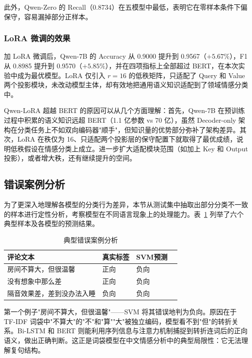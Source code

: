 此外，Qwen-Zero 的 Recall（0.8734）在五模型中最低，表明它在零样本条件下偏保守，容易漏掉部分正样本。

\subsubsection{LoRA 微调的效果}

加 LoRA 微调后，Qwen-7B 的 Accuracy 从 0.9000 提升到 0.9567（$+5.67\%$），F1 从 0.8985 提升到 0.9570（$+5.85\%$），并在四项指标上全部超过 BERT，在本次实验中成为最优模型。LoRA 仅引入 $r=16$ 的低秩矩阵，只适配了 Query 和 Value 两个投影模块，未改动模型主体，却有效地把通用语义知识适配到了领域情感分类中。

Qwen-LoRA 超越 BERT 的原因可以从几个方面理解：首先，Qwen-7B 在预训练过程中积累的语义知识远超 BERT（1.1 亿参数 vs 70 亿），虽然 Decoder-only 架构在分类任务上不如双向编码器"顺手"，但知识量的优势部分弥补了架构差异。其次，LoRA 在秩仅为 16、只适配两个投影层的保守配置下就取得了最优成绩，说明低秩假设在情感分类上成立。进一步扩大适配模块范围（如加上 Key 和 Output 投影），或者增大秩，还有继续提升的空间。

\subsection{错误案例分析}

为了更深入地理解各模型的分类行为差异，本节从测试集中抽取出部分分类不一致的样本进行定性分析，考察模型在不同语言现象上的处理能力。表~\ref{tab:error_cases} 列举了六个典型样本及各模型的预测结果。

\begin{table}[htbp]
    \centering
    \caption{典型错误案例分析}
    \label{tab:error_cases}
    \small
    \begin{tabular}{>{\centering}p{2.8cm} >{\centering}p{1.2cm} >{\centering}p{1.2cm} c}
        \toprule
        评论文本 & 真实标签 & SVM预测 \\
        \midrule
        房间不算大，但很温馨 & 正向 & 负向  \\
        没有想象中那么差 & 正向 & 负向  \\
        隔音效果差，差到没办法入睡 & 负向 & 负向 \\
        \bottomrule
    \end{tabular}
\end{table}

第一个例子"房间不算大，但很温馨"——SVM 将其错误地判为负向。原因在于 TF-IDF 词袋中"不算大"的"不"和"算""大"被独立编码，模型看不到"但"的转折关系。Bi-LSTM 和 BERT 则能利用序列信息与注意力机制捕捉到转折连词后的正向语义，做出正确判断。这正是词袋模型在中文情感分析中的典型局限性：它无法理解复句结构。


